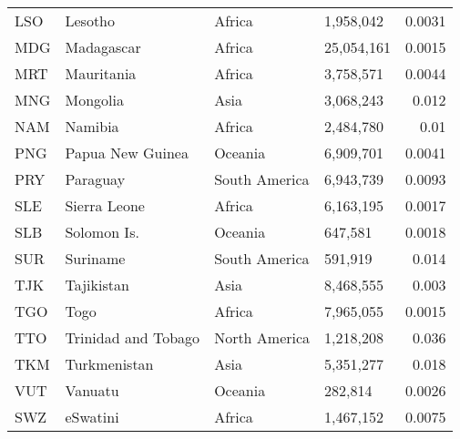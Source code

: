 \begin{table}
\begin{tabular}{llllr}
        LSO     & Lesotho              & Africa        & 1,958,042  & 0.0031        \\
        MDG     & Madagascar           & Africa        & 25,054,161 & 0.0015        \\
        MRT     & Mauritania           & Africa        & 3,758,571  & 0.0044        \\
        MNG     & Mongolia             & Asia          & 3,068,243  & 0.012         \\
        NAM     & Namibia              & Africa        & 2,484,780  & 0.01          \\
        PNG     & Papua New Guinea     & Oceania       & 6,909,701  & 0.0041        \\
        PRY     & Paraguay             & South America & 6,943,739  & 0.0093        \\
        SLE     & Sierra Leone         & Africa        & 6,163,195  & 0.0017        \\
        SLB     & Solomon Is.          & Oceania       & 647,581    & 0.0018        \\
        SUR     & Suriname             & South America & 591,919    & 0.014         \\
        TJK     & Tajikistan           & Asia          & 8,468,555  & 0.003         \\
        TGO     & Togo                 & Africa        & 7,965,055  & 0.0015        \\
        TTO     & Trinidad and Tobago  & North America & 1,218,208  & 0.036         \\
        TKM     & Turkmenistan         & Asia          & 5,351,277  & 0.018         \\
        VUT     & Vanuatu              & Oceania       & 282,814    & 0.0026        \\
        SWZ     & eSwatini             & Africa        & 1,467,152  & 0.0075        \\
        \bottomrule
    \end{tabular}
\end{table}
